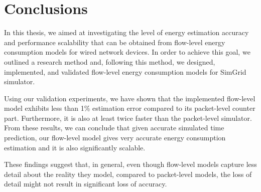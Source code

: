 \chapter{Conclusions}
\label{chapter:conclusions}

In this thesis, we aimed at investigating the level of energy estimation accuracy and performance scalability that can be obtained from flow-level energy consumption models for wired network devices. In order to achieve this goal, we outlined a research method and, following this method, we designed, implemented, and validated flow-level energy consumption models for SimGrid simulator. 

Using our validation experiments, we have shown that the implemented flow-level model exhibits less than 1\% estimation error compared to its packet-level counter part. Furthermore, it is also at least twice faster than the packet-level simulator. From these results, we can conclude that given accurate simulated time prediction, our flow-level model gives very accurate energy consumption estimation and it is also significantly scalable. 

These findings suggest that, in general, even though flow-level models capture less detail about the reality they model, compared to packet-level models, the loss of detail might not result in significant loss of accuracy. 

